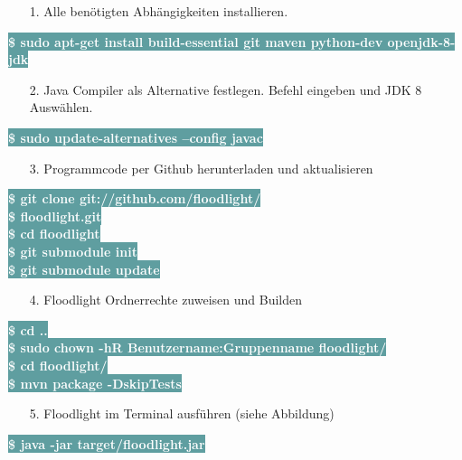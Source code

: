 \documentclass[fontsize=12pt,paper=a4,open=any,parskip=half,
  twoside=false,toc=listof,toc=bibliography,fleqn,leqno,
  captions=nooneline,captions=tableabove,british]{scrbook}
\begin{document}
\begin{itemize}
\item[1.] Alle benötigten Abhängigkeiten installieren.
\end{itemize}
\colorbox{CadetBlue}{\textcolor{white}{\textbf{\textsf{\$ sudo apt-get install build-essential git maven python-dev openjdk-8-jdk}}}}
\begin{itemize}
\item[2.] Java Compiler als Alternative festlegen. Befehl eingeben und JDK 8 Auswählen.
\end{itemize}
\colorbox{CadetBlue}{\textcolor{white}{\textbf{\textsf{\$ sudo update-alternatives --config javac}}}}
\begin{itemize}
\item[3.] Programmcode per Github herunterladen und aktualisieren
\end{itemize}
\colorbox{CadetBlue}{\textcolor{white}{\textbf{\textsf{\$ git clone git://github.com/floodlight/}}}}\\
\colorbox{CadetBlue}{\textcolor{white}{\textbf{\textsf{\$ floodlight.git}}}}\\
\colorbox{CadetBlue}{\textcolor{white}{\textbf{\textsf{\$ cd floodlight}}}}\\
\colorbox{CadetBlue}{\textcolor{white}{\textbf{\textsf{\$ git submodule init}}}}\\
\colorbox{CadetBlue}{\textcolor{white}{\textbf{\textsf{\$ git submodule update}}}}
\begin{itemize}
\item[4.] Floodlight Ordnerrechte zuweisen und Builden
\end{itemize}
\colorbox{CadetBlue}{\textcolor{white}{\textbf{\textsf{\$ cd ..}}}}\\
\colorbox{CadetBlue}{\textcolor{white}{\textbf{\textsf{\$ sudo chown -hR Benutzername:Gruppenname floodlight/}}}}\\
\colorbox{CadetBlue}{\textcolor{white}{\textbf{\textsf{\$ cd floodlight/}}}}\\
\colorbox{CadetBlue}{\textcolor{white}{\textbf{\textsf{\$ mvn package -DskipTests}}}}
\begin{itemize}
\item[5.] Floodlight im Terminal ausführen (siehe Abbildung)
\end{itemize}
\colorbox{CadetBlue}{\textcolor{white}{\textbf{\textsf{\$ java -jar target/floodlight.jar}}}}
\end{document}
